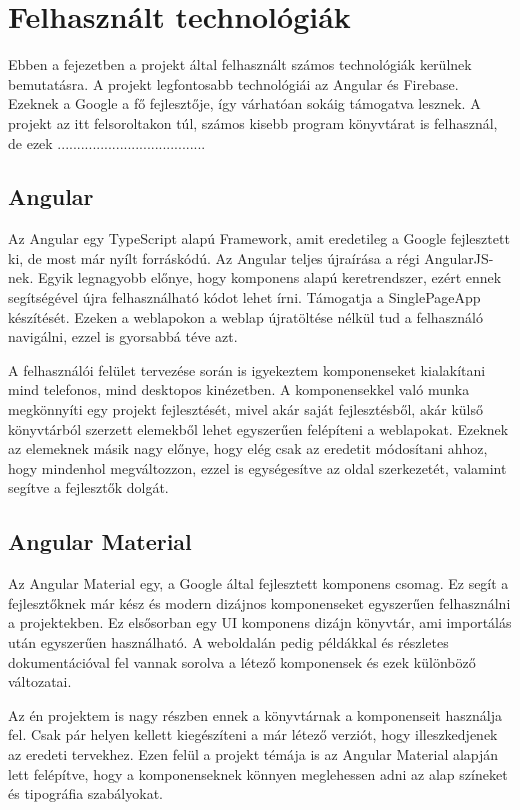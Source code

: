 \documentclass[12pt]{report}
\theoremstyle{definition}
\begin{document}
\chapter{Felhasznált technológiák}
Ebben a fejezetben a projekt által felhasznált számos technológiák kerülnek bemutatásra. A projekt legfontosabb technológiái az Angular és Firebase. Ezeknek a Google a fő fejlesztője, így várhatóan sokáig támogatva lesznek. 
A projekt az itt felsoroltakon túl, számos kisebb program könyvtárat is felhasznál, de ezek
......................................


\section{Angular}
Az Angular egy \Gls{TypeScript} alapú \Gls{Framework}, amit  eredetileg a Google fejlesztett ki, de most már nyílt forráskódú. Az Angular teljes újraírása a régi \Gls{AngularJS}-nek. Egyik legnagyobb előnye, hogy komponens alapú keretrendszer, ezért ennek segítségével újra felhasználható kódot lehet írni. Támogatja a \Gls{SinglePageApp} készítését. Ezeken a weblapokon a weblap újratöltése nélkül tud a felhasználó navigálni, ezzel is gyorsabbá téve azt.

A felhasználói felület tervezése során is igyekeztem komponenseket kialakítani mind telefonos, mind desktopos kinézetben. A komponensekkel való munka megkönnyíti egy projekt fejlesztését, mivel akár saját fejlesztésből, akár külső könyvtárból szerzett elemekből lehet egyszerűen felépíteni a weblapokat. Ezeknek az elemeknek másik nagy előnye, hogy elég csak az eredetit módosítani ahhoz, hogy mindenhol megváltozzon, ezzel is egységesítve az oldal szerkezetét, valamint segítve a fejlesztők dolgát.


\section{Angular Material} 
Az Angular Material egy, a Google által fejlesztett komponens csomag. 
Ez segít a fejlesztőknek már kész és modern dizájnos komponenseket egyszerűen felhasználni a projektekben. 
Ez elsősorban egy UI komponens dizájn könyvtár, ami importálás után egyszerűen használható. 
A weboldalán pedig példákkal és részletes dokumentációval fel vannak sorolva a létező komponensek és ezek különböző változatai.

Az én projektem is nagy részben ennek a könyvtárnak a komponenseit használja fel. 
Csak pár helyen kellett kiegészíteni a már létező verziót, hogy illeszkedjenek az eredeti tervekhez. 
Ezen felül a projekt témája is az Angular Material alapján lett felépítve, hogy a komponenseknek könnyen meglehessen adni az alap színeket és tipográfia szabályokat.
\end{document}
